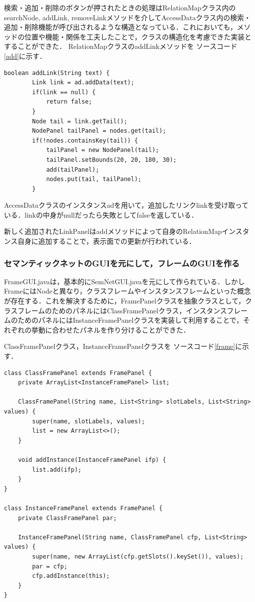 \documentclass[12pt]{jarticle}
\begin{document}
検索・追加・削除のボタンが押されたときの処理はRelationMapクラス内のsearchNode, addLink, removeLinkメソッドを介してAccessDataクラス内の検索・追加・削除機能が呼び出されるような構造となっている．これにおいても，メソッドの位置や機能・関係を工夫したことで，クラスの構造化を考慮できた実装とすることができた．
RelationMapクラスのaddLinkメソッドを
ソースコード\ref{add}に示す．

\begin{lstlisting}[caption=addLinkメソッド, label=add]
    boolean addLink(String text) {
        Link link = ad.addData(text);
        if(link == null) {
            return false;
        }
        Node tail = link.getTail();
        NodePanel tailPanel = nodes.get(tail);
        if(!nodes.containsKey(tail)) {
            tailPanel = new NodePanel(tail);
            tailPanel.setBounds(20, 20, 180, 30);
            add(tailPanel);
            nodes.put(tail, tailPanel);
        }
\end{lstlisting}

AccessDataクラスのインスタンスadを用いて，追加したリンクlinkを受け取っている．linkの中身がnullだったら失敗としてfalseを返している．

新しく追加されたLinkPanelはaddメソッドによって自身のRelationMapインスタンス自身に追加することで，表示面での更新が行われている．

\subsubsection{セマンティックネットのGUIを元にして，フレームのGUIを作る}
FrameGUI.javaは，基本的にSemNetGUI.javaを元にして作られている．しかしFrameにはNodeと異なり，クラスフレームやインスタンスフレームといった概念が存在する．これを解決するために，FramePanelクラスを抽象クラスとして，クラスフレームのためのパネルにはClassFramePanelクラス，インスタンスフレームのためのパネルにはInstanceFramePanelクラスを実装して利用することで，それぞれの挙動に合わせたパネルを作り分けることができた．

ClassFramePanelクラス，InstanceFramePanelクラスを
ソースコード\ref{frame}に示す．

\begin{lstlisting}[caption=ClassFramePanelクラス・InstanceFramePanelクラス, label=frame]
class ClassFramePanel extends FramePanel {
    private ArrayList<InstanceFramePanel> list;

    ClassFramePanel(String name, List<String> slotLabels, List<String> values) {
        super(name, slotLabels, values);
        list = new ArrayList<>();
    }

    void addInstance(InstanceFramePanel ifp) {
        list.add(ifp);
    }
}

class InstanceFramePanel extends FramePanel {
    private ClassFramePanel par;

    InstanceFramePanel(String name, ClassFramePanel cfp, List<String> values) {
        super(name, new ArrayList(cfp.getSlots().keySet()), values);
        par = cfp;
        cfp.addInstance(this);
    }
}
\end{lstlisting}
\end{document}
